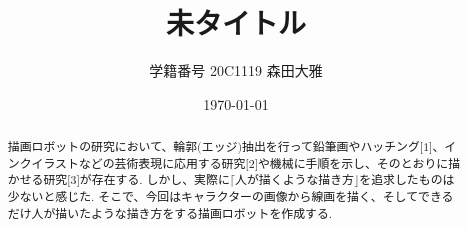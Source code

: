 \documentclass[a4j]{jarticle}			%
\title{未タイトル}
\author{学籍番号 20C1119 森田大雅}
\date{\today}
\begin{document}
	\maketitle %
	\normalsize


	\begin{abstract}
描画ロボットの研究において、輪郭$\lparen\text{エッジ}\rparen$抽出を行って鉛筆画やハッチング$\lbrack1\rbrack$、インクイラストなどの芸術表現に応用する研究$\lbrack2\rbrack$や機械に手順を示し、そのとおりに描かせる研究$\lbrack3\rbrack$が存在する.
しかし、実際に$\lceil \text{人が描くような描き方} \rfloor$を追求したものは少ないと感じた.
そこで、今回はキャラクターの画像から線画を描く、そしてできるだけ人が描いたような描き方をする描画ロボットを作成する.
	\end{abstract}
\end{document}
